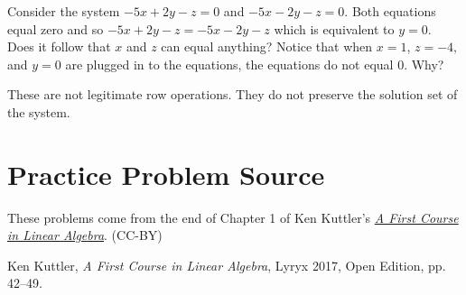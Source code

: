 \documentclass{ximera}
\begin{document}
\begin{problem}\label{prb:2.57} Consider the system $-5x+2y-z=0$ and $-5x-2y-z=0.$ Both equations
equal zero and so $-5x+2y-z=-5x-2y-z$ which is equivalent to $y=0.$ Does it follow that $x$
and $z$ can equal anything?  Notice that when $x=1$, $z=-4,$ and $y=0$ are plugged in
to the equations, the equations do not equal $0$. Why?
\begin{hint}
These are not legitimate row
operations. They do not preserve the solution set of the system.
\end{hint}
\end{problem}




\section*{Practice Problem Source}
These problems come from the end of Chapter 1 of Ken Kuttler's \href{https://open.umn.edu/opentextbooks/textbooks/a-first-course-in-linear-algebra-2017}{\it A First Course in Linear Algebra}. (CC-BY)

Ken Kuttler, {\it  A First Course in Linear Algebra}, Lyryx 2017, Open Edition, pp. 42--49. 
\end{document}
